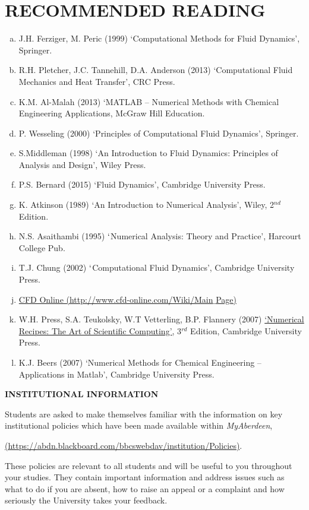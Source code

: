 \documentclass[12pts,a4paper,amsmath,amssymb,floatfix]{article}%
\begin{document}
\section{RECOMMENDED READING}

\begin{enumerate}[(a)]
   \item J.H. Ferziger, M. Peric (1999) `Computational Methods for Fluid Dynamics', Springer.
   \item R.H. Pletcher, J.C. Tannehill, D.A. Anderson (2013) `Computational Fluid Mechanics and Heat Transfer', CRC Press.
   \item K.M. Al-Malah (2013) `MATLAB -- Numerical Methods with Chemical Engineering Applications, McGraw Hill Education.
   \item P. Wesseling (2000) `Principles of Computational Fluid Dynamics', Springer.
   \item S.Middleman (1998) `An Introduction to Fluid Dynamics: Principles of Analysis and Design', Wiley Press.
   \item P.S. Bernard (2015) `Fluid Dynamics', Cambridge University Press.
   \item K. Atkinson (1989) `An Introduction to Numerical Analysis', Wiley, 2$^{nd}$ Edition.
   \item N.S. Asaithambi (1995) $\lq$Numerical Analysis: Theory and Practice', Harcourt College Pub.
   \item T.J. Chung (2002) $\lq$Computational Fluid Dynamics', Cambridge University Press.
   \item \href{http://www.cfd-online.com/Wiki/Main_Page}{CFD Online (http://www.cfd-online.com/Wiki/Main$\_$Page)}
   \item W.H. Press, S.A. Teukolsky, W.T Vetterling, B.P. Flannery (2007) \href{http://www.nr.com/oldverswitcher.html}{`Numerical Recipes: The Art of Scientific Computing'}, 3$^{rd}$ Edition, Cambridge University Press.
   \item K.J. Beers (2007) `Numerical Methods for Chemical Engineering -- Applications in Matlab', Cambridge University Press.
\end{enumerate}


\begin{center}
{\large {\bf INSTITUTIONAL INFORMATION}}
\end{center}


Students are asked to make themselves familiar with the information on key institutional policies which have been made available within {\it MyAberdeen},
\begin{center}
\href{https://abdn.blackboard.com/bbcswebdav/institution/Policies}{(https://abdn.blackboard.com/bbcswebdav/institution/Policies)}.
\end{center}
These policies are relevant to all students and will be useful to you throughout your studies. They contain important information and address issues such as what to do if you are absent, how to raise an appeal or a complaint and how seriously the University takes your feedback. 
\medskip
\end{document}
